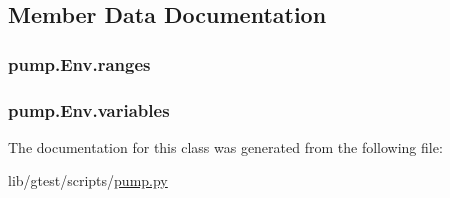 \subsection{Member Data Documentation}
\hypertarget{classpump_1_1_env_a8d5fec087c1a9108de9b105922b34309}{
\subsubsection[{ranges}]{\setlength{\rightskip}{0pt plus 5cm}pump.\-Env.\-ranges}}\label{classpump_1_1_env_a8d5fec087c1a9108de9b105922b34309}
\hypertarget{classpump_1_1_env_aba6456f3d0d23ac92bc9508c1b966bcd}{
\subsubsection[{variables}]{\setlength{\rightskip}{0pt plus 5cm}pump.\-Env.\-variables}}\label{classpump_1_1_env_aba6456f3d0d23ac92bc9508c1b966bcd}


The documentation for this class was generated from the following file\-:\begin{DoxyCompactItemize}
\item 
lib/gtest/scripts/\hyperlink{pump_8py}{pump.\-py}\end{DoxyCompactItemize}
